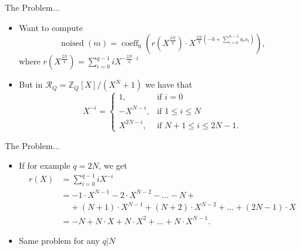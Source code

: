 \documentclass[aspectratio=169]{beamer}
\begin{document}
\begin{frame}{The Problem...}
    \begin{itemize}
        \item Want to compute
        $$\operatorname{noised}(m) = \operatorname{coeff}_0 \left(r(X^{\frac{2N}{q}}) \cdot X^{\frac{2N}{q} (-b  + \sum_{i=0}^{n-1}a_is_i)}\right),$$
        where $r(X^{\frac{2N}{q}}) = \sum_{i=0}^{q-1} iX^{- \frac{2N}{q} \cdot i}$
    \end{itemize}
    \begin{itemize}
        \item But in $\mathcal{R}_Q = \mathbb{Z}_Q[X] / (X^N + 1)$ we have that
        \begin{equation*}
          X^{-i} =
            \begin{cases}
              1, & \text{if $i=0$} \\
              -X^{N-i}, & \text{if $1 \leq i \leq N$}\\
              X^{2N-i}, & \text{if $N+1 \leq i \leq 2N-1$}.
            \end{cases}       
        \end{equation*}
    \end{itemize}
\end{frame}


\begin{frame}{The Problem...}
    \begin{itemize}
        \item If for example $q=2N$, we get
        \begin{align*}
            r(X) &= \sum_{i=0}^{q-1} iX^{-i} \\
            &= -1 \cdot X^{N-1} -2 \cdot X^{N-2} - \dots - N + \\
            & \;\;\;\; + (N+1) \cdot X^{N-1} + (N+2) \cdot X^{N-2} + \dots + (2N-1) \cdot X \\
            & = -N + N \cdot X + N \cdot X^2 + \dots + N \cdot X^{N-1}.
        \end{align*}
    \end{itemize}
    \begin{itemize}
        \item Same problem for any $q|N$ %
    \end{itemize}
\end{frame}
\end{document}
